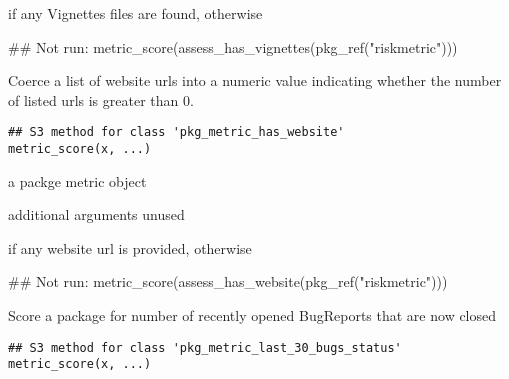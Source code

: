 \documentclass[a4paper]{book}
\begin{document}
%
\begin{Value}
 if any Vignettes files are found, otherwise 
\end{Value}
%
\begin{Examples}
\begin{ExampleCode}
## Not run: metric_score(assess_has_vignettes(pkg_ref("riskmetric")))

\end{ExampleCode}
\end{Examples}
%
\begin{Description}
Coerce a list of website urls into a numeric value indicating whether the
number of listed urls is greater than 0.
\end{Description}
%
\begin{Usage}
\begin{verbatim}
## S3 method for class 'pkg_metric_has_website'
metric_score(x, ...)
\end{verbatim}
\end{Usage}
%
\begin{Arguments}
\begin{ldescription}
\item[\code{x}] a  packge metric object

\item[\code{...}] additional arguments unused
\end{ldescription}
\end{Arguments}
%
\begin{Value}
 if any website url is provided, otherwise 
\end{Value}
%
\begin{Examples}
\begin{ExampleCode}
## Not run: metric_score(assess_has_website(pkg_ref("riskmetric")))

\end{ExampleCode}
\end{Examples}
%
\begin{Description}
Score a package for number of recently opened BugReports that are now closed
\end{Description}
%
\begin{Usage}
\begin{verbatim}
## S3 method for class 'pkg_metric_last_30_bugs_status'
metric_score(x, ...)
\end{verbatim}
\end{Usage}
\end{document}
